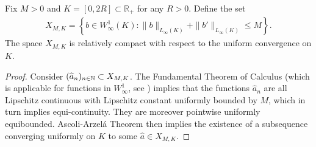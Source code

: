 \begin{proposition}\label{XMdef}
Fix $M > 0$ and $K=[0,2R] \subset  \mathbb R_+$ for any $R>0$. Define the set
\begin{align*}
X_{M,K} = \left\{b \in W^{1}_{\infty}(K) :
 \|b\|_{L_{\infty}(K)} + \|b'\|_{L_{\infty}(K)} \leq M
 \right\}.
\end{align*}
The space $X_{M,K}$ is relatively compact with respect to the uniform convergence on $K$.
\end{proposition}
\begin{proof}
Consider $(\widehat a_n)_{n \in \mathbb{N}} \subset X_{M,K}$. The Fundamental Theorem of Calculus (which is applicable for functions in $W^{1}_{\infty}$, see \cite[Theorem 2.8]{AFP00}) 
implies that the functions $\widehat a_n$ are all Lipschitz continuous with Lipschitz constant uniformly bounded by
	$M$, which in turn implies equi-continuity. They are moreover pointwise uniformly equibounded.
Ascoli-Arzel\'a Theorem then implies the existence of a subsequence converging uniformly on $K$ to some $\widehat a \in X_{M,K}$.
\end{proof}

